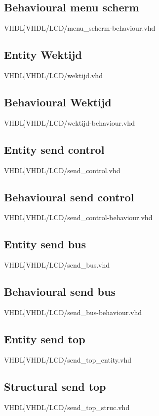 \subsection{Behavioural menu scherm}
\scriptsize 
 VHDL]{VHDL/LCD/menu_scherm-behaviour.vhd}
\normalsize
\label{code:ent_wektijd}
\subsection{Entity Wektijd}
\scriptsize 
 VHDL]{VHDL/LCD/wektijd.vhd}
\normalsize
\label{code:beh_wektijd}
\subsection{Behavioural Wektijd}
\scriptsize 
 VHDL]{VHDL/LCD/wektijd-behaviour.vhd}
\normalsize
\label{code:ent_send_control}
\subsection{Entity send control}
\scriptsize 
 VHDL]{VHDL/LCD/send_control.vhd}
\normalsize
\label{code:beh_send_control}
\subsection{Behavioural send control}
\scriptsize 
 VHDL]{VHDL/LCD/send_control-behaviour.vhd}
\normalsize
\label{code:ent_send_bus}
\subsection{Entity send bus}
\scriptsize 
 VHDL]{VHDL/LCD/send_bus.vhd}
\normalsize
\label{code:beh_send_bus}
\subsection{Behavioural send bus}
\scriptsize 
 VHDL]{VHDL/LCD/send_bus-behaviour.vhd}
\normalsize
\label{code:ent_send_top}
\subsection{Entity send top}
\scriptsize 
 VHDL]{VHDL/LCD/send_top_entity.vhd}
\normalsize
\label{code:struc_send_top}
\subsection{Structural send top}
\scriptsize 
 VHDL]{VHDL/LCD/send_top_struc.vhd}
\normalsize
